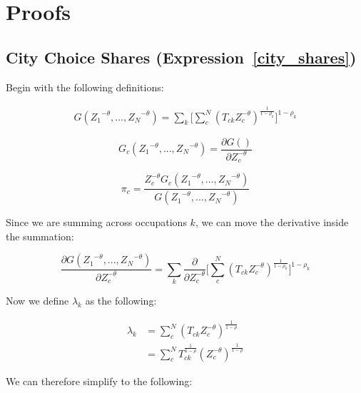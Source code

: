 \documentclass[10pt]{article}
\begin{document}
\newpage

\section{Proofs}

\subsection{City Choice Shares (Expression~\ref{city_shares})}

Begin with the following definitions:

\begin{align*}
    G({Z_{1}}^{-\theta},...,{Z_{N}}^{-\theta})=\sum\limits_{k}\Big[\sum\limits_{c}^{N}({T_{ck}}{Z_{c}^{-\theta}})^{\frac{1}{1-\rho_{k}}}\Big]^{1-\rho_{k}}
\end{align*}

\begin{equation*}
    G_{c}({Z_{1}}^{-\theta},...,{Z_{N}}^{-\theta})=\frac{\partial{G()}}{\partial{Z_{c}^{-\theta}}}
\end{equation*}

\begin{equation*}
    \pi_{c}=\frac{Z_{c}^{-\theta}{G_{c} ({Z_{1}}^{-\theta},...,{Z_{N}}^{-\theta})}}{G({Z_{1}}^{-\theta},...,{Z_{N}}^{-\theta})}
\end{equation*}

Since we are summing across occupations $k$, we can move the derivative inside the summation:

\begin{equation*}
    \frac{\partial{G({Z_{1}}^{-\theta},...,{Z_{N}}^{-\theta})}}{\partial{Z_{c}^{-\theta}}} = \sum\limits_{k}\frac{\partial}{\partial{Z_{c}^{-\theta}}}\Big[\sum\limits_{c}^{N}({T_{ck}}{Z_{c}^{-\theta}})^{\frac{1}{1-\rho_{k}}}\Big]^{1-\rho_{k}}
\end{equation*}

Now we define $\lambda_k$ as the following:

\begin{align*}
    \lambda_{k} & = \sum\limits_{c}^{N}({T_{ck}}{Z_{c}^{-\theta}})^{\frac{1}{1-\rho}}                  \\
                & = \sum\limits_{c}^{N}{T^{\frac{1}{1-\rho}}_{ck}}(Z_{c}^{-\theta})^{\frac{1}{1-\rho}}
\end{align*}

We can therefore simplify to the following:
\end{document}

